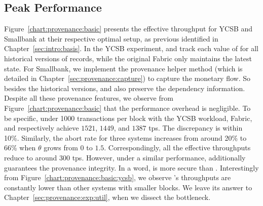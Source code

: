 \subsection{Peak Performance}
\label{sec:provenance:exp:peak}

Figure~\ref{chart:provenance:basic} presents the effective throughput for YCSB and Smallbank at their respective optimal setup, as previous identified in Chapter~\ref{sec:intro:basis}. 
In the YCSB experiment, {\fsPrO} and {\fsO} track each value of for all historical versions of records, while the original Fabric only maintains the latest state. 
For Smallbank, we implement the provenance helper method (which is detailed in Chapter~\ref{sec:provenance:capture}) to capture the monetary flow. 
So besides the historical versions, {\fsPrO} and {\fsO} also preserve the dependency information. 
Despite all these provenance features, we observe from Figure~\ref{chart:provenance:basic} that the performance overhead is negligible. 
To be specific, under 1000 transactions per block with the YCSB workload, Fabric, {\fsPrO} and {\fsO} respectively achieve $1521$, $1449$, and $1387$ tps. The discrepancy is within 10\%. 
Similarly, the abort rate for three systems increases from around 20\% to 66\% when $\theta$ grows from $0$ to $1.5$.
Correspondingly, all the effective throughputs reduce to around 300 tps. 
However, under a similar performance, {\fsO} additionally guarantees the provenance integrity. 
In a word, {\fsO} is more secure than {\fsPrO}. 
Interestingly from Figure~\ref{chart:provenance:basic:ycsb}, we observe {\fsPrO}'s throughputs are constantly lower than other systems with smaller blocks. 
We leave its answer to Chapter~\ref{sec:provenance:exp:util}, when we dissect the bottleneck. 

